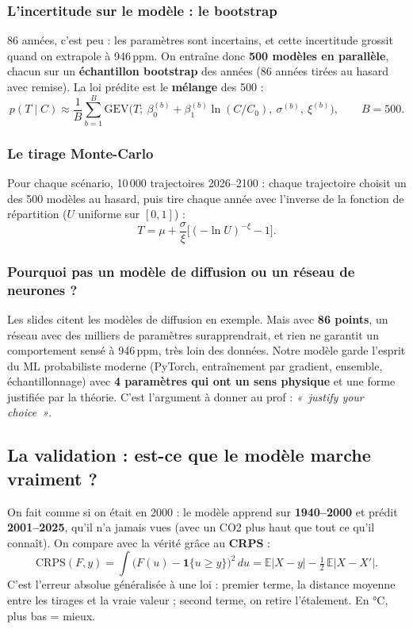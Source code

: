 \documentclass[11pt,a4paper]{article}
\newcommand{\en}[1]{\textit{«~#1~»}}
\begin{document}
\subsubsection*{L'incertitude sur le modèle : le bootstrap}
86 années, c'est peu : les paramètres sont incertains, et cette incertitude grossit quand on extrapole à 946\,ppm. On entraîne donc \textbf{500 modèles en parallèle}, chacun sur un \textbf{échantillon bootstrap} des années (86 années tirées au hasard avec remise). La loi prédite est le \textbf{mélange} des 500 :
\[
p(T\mid C)\approx\frac1B\sum_{b=1}^{B}\mathrm{GEV}\Big(T;\ \beta_0^{(b)}+\beta_1^{(b)}\ln(C/C_0),\ \sigma^{(b)},\ \xi^{(b)}\Big),\qquad B=500.
\]

\subsubsection*{Le tirage Monte-Carlo}
Pour chaque scénario, 10\,000 trajectoires 2026--2100 : chaque trajectoire choisit un des 500 modèles au hasard, puis tire chaque année avec l'inverse de la fonction de répartition ($U$ uniforme sur $[0,1]$) :
\[
T=\mu+\frac{\sigma}{\xi}\Big[(-\ln U)^{-\xi}-1\Big].
\]

\subsubsection*{Pourquoi pas un modèle de diffusion ou un réseau de neurones ?}
Les slides citent les modèles de diffusion en exemple. Mais avec \textbf{86 points}, un réseau avec des milliers de paramètres surapprendrait, et rien ne garantit un comportement sensé à 946\,ppm, très loin des données. Notre modèle garde l'esprit du ML probabiliste moderne (PyTorch, entraînement par gradient, ensemble, échantillonnage) avec \textbf{4 paramètres qui ont un sens physique} et une forme justifiée par la théorie. C'est l'argument à donner au prof : \en{justify your choice}.

\subsection{La validation : est-ce que le modèle marche vraiment ?}

On fait comme si on était en 2000 : le modèle apprend sur \textbf{1940--2000} et prédit \textbf{2001--2025}, qu'il n'a jamais vues (avec un CO2 plus haut que tout ce qu'il connaît). On compare avec la vérité grâce au \textbf{CRPS} :
\[
\mathrm{CRPS}(F,y)=\int\big(F(u)-\mathbf 1\{u\ge y\}\big)^2\,du=\mathbb E|X-y|-\tfrac12\,\mathbb E|X-X'|.
\]
C'est l'erreur absolue généralisée à une loi : premier terme, la distance moyenne entre les tirages et la vraie valeur ; second terme, on retire l'étalement. En °C, plus bas = mieux.
\end{document}
